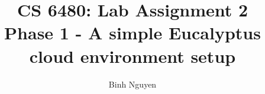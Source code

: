 \documentclass[letterpaper,twocolumn,10pt]{article}
\title{CS 6480: Lab Assignment 2\\
Phase 1 - A simple Eucalyptus cloud environment setup }
\author[1]{Binh Nguyen}
\affil[1]{School of Computing, University of Utah}
\begin{document}
\maketitle



{
  \small 
  
  
}
\end{document}
